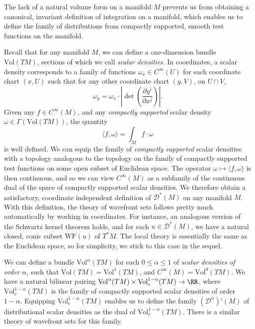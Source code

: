 The lack of a natural volume form on a manifold $M$ prevents us from obtaining a canonical, invariant definition of integration on a manifold, which enables us to define the family of distributions from compactly supported, smooth test functions on the manifold.

Recall that for any manifold $M$, we can define a one-dimension bundle $\text{Vol}(TM)$, sections of which we call \emph{scalar densities}. In coordinates, a scalar density corresponds to a family of functions $\omega_x \in C^\infty(U)$ for each coordinate chart $(x,U)$ such that for any other coordinate chart $(y,V)$, on $U \cap V$,
%
\[ \omega_y = \omega_x \cdot \left| \det \left( \frac{\partial y^i}{\partial x^j} \right) \right|. \]
%
Given any $f \in C^\infty(M)$, and any \emph{compactly supported} scalar density $\omega \in \Gamma(\text{Vol}(TM))$, the quantity
%
\[ \langle f, \omega \rangle = \int_M f \cdot \omega \]
%
is well defined. We can equip the family of \emph{compactly supported} scalar densities with a topology analogous to the topology on the family of compactly supported test functions on some open subset of Euclidean space. The operator $\omega \mapsto \langle f, \omega \rangle$ is then continuous, and so we can view $C^\infty(M)$ as a subfamily of the continuous dual of the space of compactly supported scalar densities. We therefore obtain a satisfactory, coordinate independent definition of $\mathcal{D}^*(M)$ on any manifold $M$. With this definition, the theory of wavefront sets follows pretty much automatically by working in coordinates. For instance, an analogous version of the Schwartz kernel theorem holds, and for each $u \in \mathcal{D}^*(M)$, we have a natural closed, conic subset $\text{WF}(u)$ of $T^*M$. The local theory is essentially the same as the Euclidean space, so for simplicity, we stick to this case in the sequel.

\begin{remark}
    We can define a bundle $\text{Vol}^\alpha(TM)$ for each $0 \leq \alpha \leq 1$ of \emph{scalar densities of order $\alpha$}, such that $\text{Vol}(TM) = \text{Vol}^1(TM)$, and $C^\infty(M) = \text{Vol}^0(TM)$. We have a natural bilinear pairing $\text{Vol}^\alpha(TM) \times \text{Vol}^{1-\alpha}_c(TM) \to \RR$, where $\text{Vol}^{1-\alpha}_c(TM)$ is the family of compactly supported scalar densities of order $1 - \alpha$. Equipping $\text{Vol}^{1-\alpha}_c(TM)$ enables us to define the family $(\mathcal{D}^\alpha)'(M)$ of distributional scalar densities as the dual of $\text{Vol}^{1-\alpha}_c(TM)$. There is a similar theory of wavefront sets for this family.
\end{remark}

